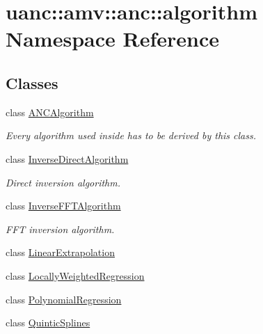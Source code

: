 \hypertarget{namespaceuanc_1_1amv_1_1anc_1_1algorithm}{}\section{uanc\+:\+:amv\+:\+:anc\+:\+:algorithm Namespace Reference}
\label{namespaceuanc_1_1amv_1_1anc_1_1algorithm}
\subsection*{Classes}
\begin{DoxyCompactItemize}
\item 
class \hyperlink{classuanc_1_1amv_1_1anc_1_1algorithm_1_1_a_n_c_algorithm}{A\+N\+C\+Algorithm}
\begin{DoxyCompactList}\small\item\em Every algorithm used inside has to be derived by this class. \end{DoxyCompactList}\item 
class \hyperlink{classuanc_1_1amv_1_1anc_1_1algorithm_1_1_inverse_direct_algorithm}{Inverse\+Direct\+Algorithm}
\begin{DoxyCompactList}\small\item\em Direct inversion algorithm. \end{DoxyCompactList}\item 
class \hyperlink{classuanc_1_1amv_1_1anc_1_1algorithm_1_1_inverse_f_f_t_algorithm}{Inverse\+F\+F\+T\+Algorithm}
\begin{DoxyCompactList}\small\item\em F\+FT inversion algorithm. \end{DoxyCompactList}\item 
class \hyperlink{classuanc_1_1amv_1_1anc_1_1algorithm_1_1_linear_extrapolation}{Linear\+Extrapolation}
\item 
class \hyperlink{classuanc_1_1amv_1_1anc_1_1algorithm_1_1_locally_weighted_regression}{Locally\+Weighted\+Regression}
\item 
class \hyperlink{classuanc_1_1amv_1_1anc_1_1algorithm_1_1_polynomial_regression}{Polynomial\+Regression}
\item 
class \hyperlink{classuanc_1_1amv_1_1anc_1_1algorithm_1_1_quintic_splines}{Quintic\+Splines}
\end{DoxyCompactItemize}
